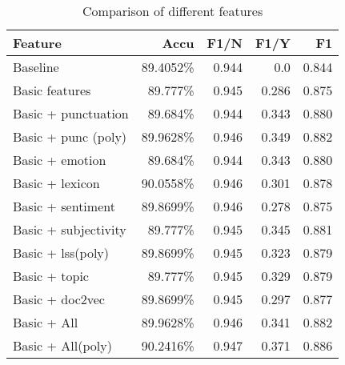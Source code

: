 \documentclass[11pt]{article}
\begin{document}
%
\begin{table}[h]
\begin{center}
    \begin{tabular}{|p{1.5cm}|r|r|r|r|}
      \hline
      Feature & Accu & F1/N & F1/Y & F1\\
      \hline
      \rowcolor{Gray}Baseline & 89.4052\% & 0.944 & 0.0 & 0.844\\
      \hline
      \rowcolor{Gray}Basic features & 89.777\% & 0.945 & 0.286 & 0.875\\
      \hline
      Basic + punctuation& 89.684\% & 0.944 & 0.343 & 0.880\\
      \hline
      \rowcolor{blue!30}Basic + punc (poly)& 89.9628\% & 0.946 & 0.349 & 0.882\\
      \hline
      Basic + emotion& 89.684\% & 0.944 & 0.343 & 0.880\\
      \hline
      Basic + lexicon& 90.0558\% & 0.946 & 0.301 & 0.878\\
      \hline
      Basic + sentiment & 89.8699\% & 0.946 & 0.278 & 0.875\\
      \hline
      Basic + subjectivity & 89.777\% & 0.945 & 0.345 & 0.881\\
      \hline
      \rowcolor{blue!30}Basic + lss\footnotemark(poly) & 89.8699\% & 0.945 & 0.323 & 0.879\\
      \hline
      Basic + topic & 89.777\% & 0.945 & 0.329 & 0.879\\
      \hline
      Basic + doc2vec & 89.8699\% & 0.945 & 0.297 & 0.877\\
      \hline
      Basic + All & 89.9628\% & 0.946 & 0.341 & 0.882\\
      \hline
      \rowcolor{red!30}Basic + All(poly) & 90.2416\% & 0.947 & 0.371 & 0.886\\
      \hline
    \end{tabular}
    \caption{Comparison of different features}\label{table1}
\end{center}
\end{table}
\end{document}
